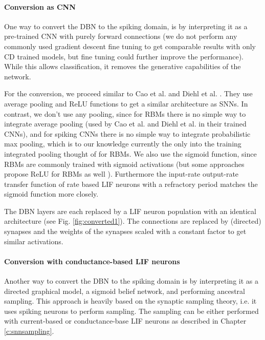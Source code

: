 \paragraph{Conversion as CNN}  \label{c:convascnn}

One way to convert the DBN to the spiking domain, is by interpreting it as a pre-trained CNN with purely forward connections (we do not perform any commonly used gradient descent fine tuning to get comparable results with only CD trained models, but fine tuning could further improve the performance).
While this allows classification, it removes the generative capabilities of the network.

For the conversion, we proceed similar to Cao et al. and Diehl et al. \cite{Cao2014, Diehl2015}.
They use average pooling and ReLU functions to get a similar architecture as SNNs.
In contrast, we don't use any pooling, since for RBMs there is no simple way to integrate average pooling (used by Cao et al. and Diehl et al. in their trained CNNs), and for spiking CNNs there is no simple way to integrate probabilistic max pooling, which is to our knowledge currently the only into the training integrated pooling thought of for RBMs.
We also use the sigmoid function, since RBMs are commonly trained with sigmoid activations (but some approaches propose ReLU for RBMs as well \cite{Nair2010}).
Furthermore the input-rate output-rate transfer function of rate based LIF neurons with a refractory period matches the sigmoid function more closely.

The DBN layers are each replaced by a LIF neuron population with an identical architecture (see Fig. \ref{fig:converted1}). 
The connections are replaced by (directed) synapses and the weights of the synapses scaled with a constant factor to get similar activations.
 

\paragraph{Conversion with conductance-based LIF neurons} \label{c:convascoba}

Another way to convert the DBN to the spiking domain is by interpreting it as a directed graphical model, a sigmoid belief network, and performing ancestral sampling.
This approach is heavily based on the synaptic sampling theory, i.e. it uses spiking neurons to perform sampling.
The sampling can be either performed with current-based or conductance-base LIF neurons as described in Chapter \ref{c:snnsampling}.

